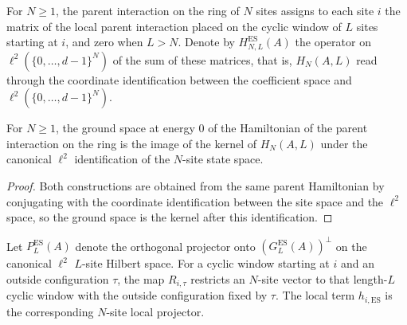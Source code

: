 \begin{definition}
    \label{def:parent_hamiltonian_es}
    \leanok
    For $N\ge1$, the parent interaction on the ring of $N$ sites assigns to
    each site $i$ the matrix of the local parent interaction placed on the
    cyclic window of $L$ sites starting at $i$, and zero when $L>N$. Denote
    by $H_{N,L}^{\mathrm{ES}}(A)$ the operator on
    $\ell^2(\{0,\ldots,d-1\}^N)$ of the sum of these matrices, that is,
    $H_N(A,L)$ read through the coordinate identification between the
    coefficient space and $\ell^2(\{0,\ldots,d-1\}^N)$.
\end{definition}

\begin{lemma}
    \label{thm:parent_ring_ground_space_kernel}
    \leanok
    For $N\ge1$, the ground space at energy $0$ of the Hamiltonian of the
    parent interaction on the ring is the image of the kernel of
    $H_N(A,L)$ under the canonical $\ell^2$ identification of the
    $N$-site state space.
\end{lemma}

\begin{proof}
    \leanok
    Both constructions are obtained from the same parent Hamiltonian by
    conjugating with the coordinate identification between the site space and
    the $\ell^2$ space, so the ground space is the kernel after this
    identification.
\end{proof}

\begin{remark}
    \label{rem:euclidean_local_projector_ingredients}
    \leanok
    Let $P_L^{\mathrm{ES}}(A)$ denote the orthogonal projector onto
    $(G_L^{\mathrm{ES}}(A))^\perp$ on the canonical $\ell^2$ $L$-site Hilbert
    space. For a cyclic window starting at $i$ and an outside configuration
    $\tau$, the map $R_{i,\tau}$ restricts an $N$-site vector to that
    length-$L$ cyclic window with the outside configuration fixed by $\tau$.
    The local term $h_{i,\mathrm{ES}}$ is the corresponding $N$-site local
    projector.
\end{remark}

